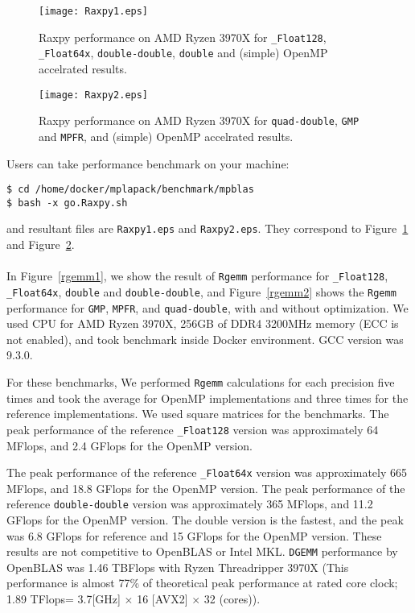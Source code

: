 \documentclass[12pt]{article}
\begin{document}
\begin{figure}
\caption{Raxpy performance on AMD Ryzen 3970X for {\tt \_Float128}, {\tt \_Float64x}, {\tt double-double}, {\tt double} and (simple) OpenMP accelrated results. } \label{raxpy1}
\begin{center}
\texttt{[image: Raxpy1.eps]}
\end{center}
\end{figure}


\begin{figure}
\caption{Raxpy performance on AMD Ryzen 3970X for {\tt quad-double}, {\tt GMP} and {\tt MPFR}, and (simple) OpenMP accelrated results. }
\label{raxpy2}
\begin{center}
\texttt{[image: Raxpy2.eps]}
\end{center}
\end{figure}

Users can take performance benchmark on your machine:
\begin{verbatim}
$ cd /home/docker/mplapack/benchmark/mpblas
$ bash -x go.Raxpy.sh
\end{verbatim}
and resultant files are {\tt Raxpy1.eps}  and {\tt Raxpy2.eps}. They correspond to Figure~\ref{raxpy1} and Figure~\ref{raxpy2}. 
\\
\\
In Figure~\ref{rgemm1}, we show the result of {\tt Rgemm} performance for {\tt \_Float128}, {\tt \_Float64x}, {\tt double} and  {\tt double-double}, and Figure~\ref{rgemm2} shows the {\tt Rgemm} performance for {\tt GMP}, {\tt MPFR}, and {\tt quad-double}, with and without optimization. We used CPU for AMD Ryzen 3970X, 256GB of DDR4 3200MHz memory (ECC is not enabled), and took benchmark inside Docker environment. GCC version was 9.3.0.

For these benchmarks, We performed {\tt Rgemm} calculations for each precision five times and took the average for OpenMP implementations and three times for the reference implementations. We used square matrices for the benchmarks.
The peak performance of the reference {\tt \_Float128} version was approximately 64 MFlops, and 2.4 GFlops for the OpenMP version. 

The peak performance of the reference {\tt \_Float64x} version
was approximately 665 MFlops, and 18.8 GFlops for the OpenMP version. The peak performance of the reference {\tt double-double} version was approximately 365 MFlops, and 11.2 GFlops for the OpenMP version. 
The double version is the fastest, and the peak was 6.8 GFlops for reference and 15 GFlops for the OpenMP version. These results are not competitive to OpenBLAS or Intel MKL. {\tt DGEMM} performance by OpenBLAS was 1.46 TBFlops with Ryzen Threadripper 3970X (This performance is almost 77\% of theoretical peak performance at rated core clock; 1.89 TFlops= 3.7[GHz] $\times$ 16 [AVX2] $\times$ 32 (cores)).
\end{document}
